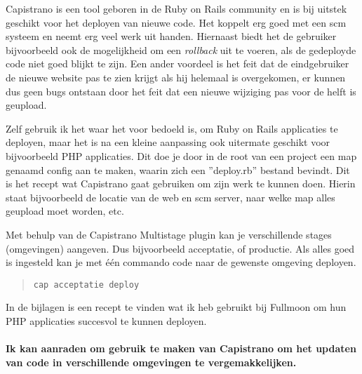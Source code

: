 Capistrano is een tool geboren in de Ruby on Rails community en is bij uitstek geschikt voor het deployen van nieuwe code. Het koppelt erg goed met een {\sc scm} systeem en neemt erg veel werk uit handen. Hiernaast biedt het de gebruiker bijvoorbeeld ook de mogelijkheid om een \emph{rollback} uit te voeren, als de gedeployde code niet goed blijkt te zijn. Een ander voordeel is het feit dat de eindgebruiker de nieuwe website pas te zien krijgt als hij helemaal is overgekomen, er kunnen dus geen bugs ontstaan door het feit dat een nieuwe wijziging pas voor de helft is geupload.

Zelf gebruik ik het waar het voor bedoeld is, om Ruby on Rails applicaties te deployen, maar het is na een kleine aanpassing ook uitermate geschikt voor bijvoorbeeld PHP applicaties. Dit doe je door in de root van een project een map genaamd config aan te maken, waarin zich een ''deploy.rb'' bestand bevindt. Dit is het recept wat Capistrano gaat gebruiken om zijn werk te kunnen doen. Hierin staat bijvoorbeeld de locatie van de web en {\sc scm} server, naar welke map alles geupload moet worden, etc.

Met behulp van de Capistrano Multistage plugin\cite{capistranomultistage} kan je verschillende stages (omgevingen) aangeven. Dus bijvoorbeeld acceptatie, of productie. Als alles goed is ingesteld kan je met \'{e}\'{e}n commando code naar de gewenste omgeving deployen.

\begin{quote}
  \texttt{cap acceptatie deploy}
\end{quote}

In de bijlagen is een recept te vinden wat ik heb gebruikt bij Fullmoon om hun PHP applicaties succesvol te kunnen deployen.

\paragraph{Ik kan aanraden om gebruik te maken van Capistrano om het updaten van code in verschillende omgevingen te vergemakkelijken.}
